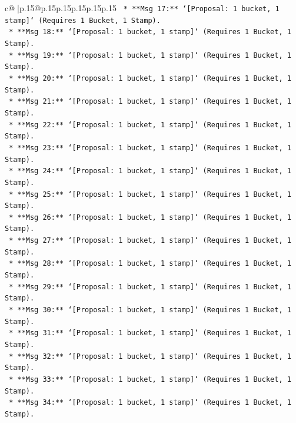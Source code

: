 \documentclass{article}
\begin{document}
{\begin{supertabular}{c@{$\;$}|p{.15\linewidth}@{}p{.15\linewidth}p{.15\linewidth}p{.15\linewidth}p{.15\linewidth}p{.15\linewidth}}
{{{\texttt{                *   **Msg 17:** `{[}Proposal: 1 bucket, 1 stamp{]}` (Requires 1 Bucket, 1 Stamp).} \\
\texttt{                *   **Msg 18:** `{[}Proposal: 1 bucket, 1 stamp{]}` (Requires 1 Bucket, 1 Stamp).} \\
\texttt{                *   **Msg 19:** `{[}Proposal: 1 bucket, 1 stamp{]}` (Requires 1 Bucket, 1 Stamp).} \\
\texttt{                *   **Msg 20:** `{[}Proposal: 1 bucket, 1 stamp{]}` (Requires 1 Bucket, 1 Stamp).} \\
\texttt{                *   **Msg 21:** `{[}Proposal: 1 bucket, 1 stamp{]}` (Requires 1 Bucket, 1 Stamp).} \\
\texttt{                *   **Msg 22:** `{[}Proposal: 1 bucket, 1 stamp{]}` (Requires 1 Bucket, 1 Stamp).} \\
\texttt{                *   **Msg 23:** `{[}Proposal: 1 bucket, 1 stamp{]}` (Requires 1 Bucket, 1 Stamp).} \\
\texttt{                *   **Msg 24:** `{[}Proposal: 1 bucket, 1 stamp{]}` (Requires 1 Bucket, 1 Stamp).} \\
\texttt{                *   **Msg 25:** `{[}Proposal: 1 bucket, 1 stamp{]}` (Requires 1 Bucket, 1 Stamp).} \\
\texttt{                *   **Msg 26:** `{[}Proposal: 1 bucket, 1 stamp{]}` (Requires 1 Bucket, 1 Stamp).} \\
\texttt{                *   **Msg 27:** `{[}Proposal: 1 bucket, 1 stamp{]}` (Requires 1 Bucket, 1 Stamp).} \\
\texttt{                *   **Msg 28:** `{[}Proposal: 1 bucket, 1 stamp{]}` (Requires 1 Bucket, 1 Stamp).} \\
\texttt{                *   **Msg 29:** `{[}Proposal: 1 bucket, 1 stamp{]}` (Requires 1 Bucket, 1 Stamp).} \\
\texttt{                *   **Msg 30:** `{[}Proposal: 1 bucket, 1 stamp{]}` (Requires 1 Bucket, 1 Stamp).} \\
\texttt{                *   **Msg 31:** `{[}Proposal: 1 bucket, 1 stamp{]}` (Requires 1 Bucket, 1 Stamp).} \\
\texttt{                *   **Msg 32:** `{[}Proposal: 1 bucket, 1 stamp{]}` (Requires 1 Bucket, 1 Stamp).} \\
\texttt{                *   **Msg 33:** `{[}Proposal: 1 bucket, 1 stamp{]}` (Requires 1 Bucket, 1 Stamp).} \\
\texttt{                *   **Msg 34:** `{[}Proposal: 1 bucket, 1 stamp{]}` (Requires 1 Bucket, 1 Stamp).} \\
}}}
\end{supertabular}}
\end{document}

